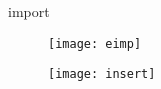 \begin{frame}[noframenumbering]{import}
	\begin{figure}
		\centering\texttt{[image: eimp]}
	\end{figure}
	\vspace{-1cm}
	\begin{figure}
		\centering\texttt{[image: insert]}
	\end{figure}
\end{frame}